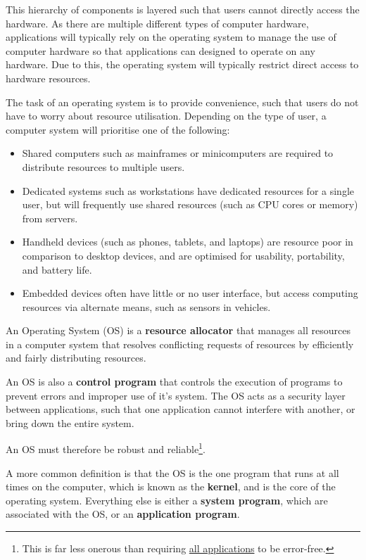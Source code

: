 \documentclass{article}
\begin{document}
This hierarchy of components is layered such that users cannot directly access the hardware.
As there are multiple different types of computer hardware, applications will typically rely on the operating system
to manage the use of computer hardware so that applications can designed to operate on any hardware. Due to this,
the operating system will typically restrict direct access to hardware resources.

The task of an operating system is to provide convenience, such that users do not have to worry about resource utilisation.
Depending on the type of user, a computer system will prioritise one of the following:
\begin{itemize}
    \item Shared computers such as mainframes or minicomputers are required to distribute resources to multiple users.
    \item Dedicated systems such as workstations have dedicated resources for a single user, but will frequently use shared resources (such as CPU cores or memory) from servers.
    \item Handheld devices (such as phones, tablets, and laptops) are resource poor in comparison to desktop devices, and are optimised for usability, portability, and battery life.
    \item Embedded devices often have little or no user interface, but access computing resources via alternate means, such as sensors in vehicles.
\end{itemize}
\begin{definition}
    An Operating System (OS) is a \textbf{resource allocator} that manages all resources in a computer system
    that resolves conflicting requests of resources by efficiently and fairly distributing resources.

    An OS is also a \textbf{control program} that controls the execution of programs to prevent errors and improper use of it's system.
    The OS acts as a security layer between applications, such that one application cannot interfere with another, or bring down the entire system.

    An OS must therefore be robust and reliable\footnote{This is far less onerous than requiring \underline{all applications} to be error-free.}.
\end{definition}
A more common definition is that the OS is the one program that runs at all times on the computer, which is known as the \textbf{kernel},
and is the core of the operating system. Everything else is either a \textbf{system program}, which are associated with the OS, or an \textbf{application program}.
\end{document}
